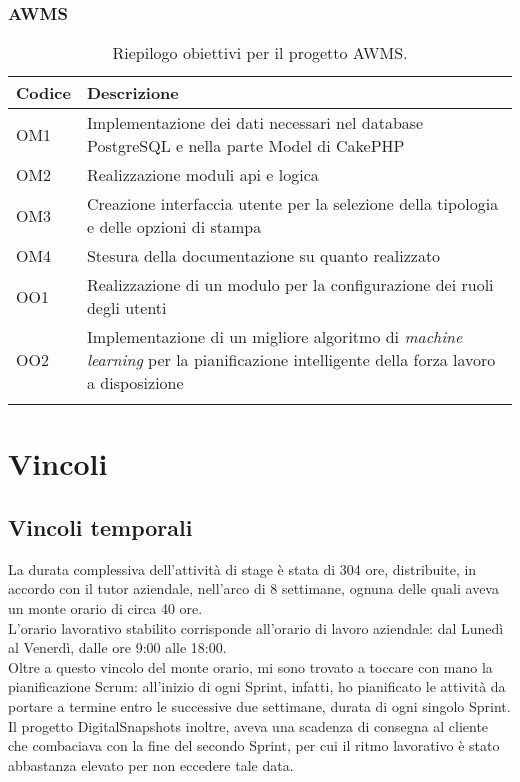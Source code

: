 \subsubsection*{AWMS}
\begin{center}
	\renewcommand{\arraystretch}{1.5}
	\begin{longtable}{ | p{0.1\linewidth} | p{0.9\linewidth} | }	 
		\hline   
	    \rowcolor{header}\textbf{Codice}&\textbf{Descrizione}\\
		\hline   	
    	OM1 & Implementazione dei dati necessari nel database PostgreSQL e nella parte Model di CakePHP \\
    	OM2 & Realizzazione moduli \acrshort{api} e logica \\
    	OM3 & Creazione interfaccia utente per la selezione della tipologia e delle opzioni di stampa \\
    	OM4 & Stesura della documentazione su quanto realizzato \\
    	OO1 & Realizzazione di un modulo per la configurazione dei ruoli degli utenti \\
    	OO2 & Implementazione di un migliore algoritmo di \textit{\gls{machine learning}} per la pianificazione intelligente della forza lavoro a disposizione \\
    	\hline
    	\rowcolor{white}
    	\caption{Riepilogo obiettivi per il progetto AWMS.}
	\end{longtable}
	\label{tab:obiettivi-AWMS}
\end{center}

\section{Vincoli}
\subsection{Vincoli temporali}
\label{subsec:vincoli-temporali}

La durata complessiva dell'attività di stage è stata di 304 ore, distribuite, in accordo con il tutor aziendale, nell'arco di 8 settimane, ognuna delle quali aveva un monte orario di circa 40 ore. \\
L'orario lavorativo stabilito corrisponde all'orario di lavoro aziendale: dal Lunedì al Venerdì, dalle ore 9:00 alle 18:00.\\
Oltre a questo vincolo del monte orario, mi sono trovato a toccare con mano la pianificazione Scrum: all'inizio di ogni Sprint, infatti, ho pianificato le attività da portare a termine entro le successive due settimane, durata di ogni singolo Sprint.\\
Il progetto DigitalSnapshots inoltre, aveva una scadenza di consegna al cliente che combaciava con la fine del secondo Sprint, per cui il ritmo lavorativo è stato abbastanza elevato per non eccedere tale data.

